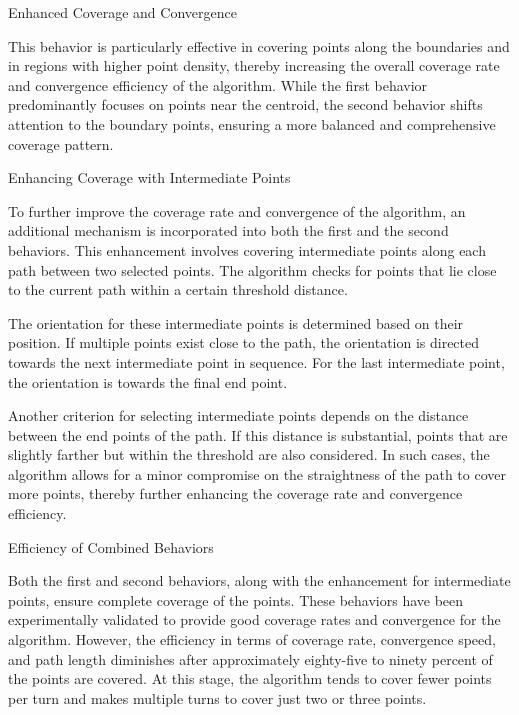 \vspace*{6mm}   

Enhanced Coverage and Convergence

This behavior is particularly effective in covering points along the boundaries and in regions with higher point density, thereby increasing the overall coverage rate and convergence efficiency of the algorithm. While the first behavior predominantly focuses on points near the centroid, the second behavior shifts attention to the boundary points, ensuring a more balanced and comprehensive coverage pattern.


\vspace*{6mm}   

Enhancing Coverage with Intermediate Points

To further improve the coverage rate and convergence of the algorithm, an additional mechanism is incorporated into both the first and the second behaviors. This enhancement involves covering intermediate points along each path between two selected points. The algorithm checks for points that lie close to the current path within a certain threshold distance.

\vspace*{6mm}   

The orientation for these intermediate points is determined based on their position. If multiple points exist close to the path, the orientation is directed towards the next intermediate point in sequence. For the last intermediate point, the orientation is towards the final end point.

\vspace*{6mm}   

Another criterion for selecting intermediate points depends on the distance between the end points of the path. If this distance is substantial, points that are slightly farther but within the threshold are also considered. In such cases, the algorithm allows for a minor compromise on the straightness of the path to cover more points, thereby further enhancing the coverage rate and convergence efficiency.

\vspace*{6mm}   

Efficiency of Combined Behaviors

Both the first and second behaviors, along with the enhancement for intermediate points, ensure complete coverage of the points. These behaviors have been experimentally validated to provide good coverage rates and convergence for the algorithm. However, the efficiency in terms of coverage rate, convergence speed, and path length diminishes after approximately eighty-five to ninety percent of the points are covered. At this stage, the algorithm tends to cover fewer points per turn and makes multiple turns to cover just two or three points.


